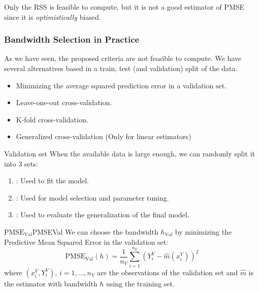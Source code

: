 Only the RSS is feasible to compute, but it is not a good estimator of PMSE
since it is \emph{optimistically} biased.

\subsubsection{Bandwidth Selection in Practice}
As we have seen, the proposed criteria are not feasible to compute. We have several
alternatives based in a train, test (and validation) split of the data.
\begin{itemize}
    \item Minimizing the average squared prediction error in a validation set.
    \item Leave-one-out cross-validation.
    \item K-fold cross-validation.
    \item Generalized cross-validation (Only for linear estimators)
\end{itemize}

\begin{definition}{Validation set}{}
    When the available data is large enough, we can randomly split it into
    3 sets:
    \begin{enumerate}
        \item {}: Used to fit the model.
        \item {}: Used for model selection and parameter tuning.
        \item {}: Used to evaluate the generalization of the final model.
    \end{enumerate}
\end{definition}

\begin{definition}{$\text{PMSE}_\text{Val}$}{PMSEVal}
We can choose the bandwidth $h_\text{Val}$ by minimizing the
Predictive Mean Squared Error in the validation set:
\begin{equation*}
    \text{PMSE}_\text{Val}(h) = \frac{1}{n_V} \sum_{i=1}^{n_V} \left( Y_i^V - \hat m(x_i^V) \right)^2
\end{equation*}
where $(x_i^V, Y_i^V),\,i=1,\ldots,n_V$ are the observations of the validation set and
$\hat m$ is the estimator with bandwidth $h$ using the training set.
\end{definition}

